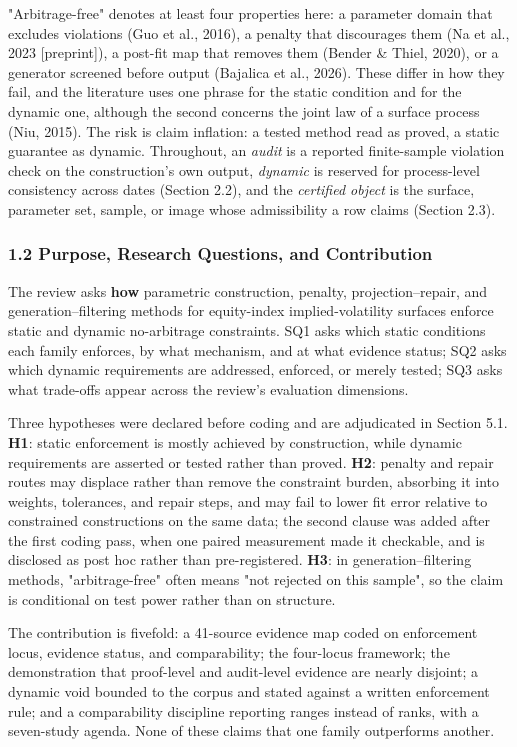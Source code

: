 \documentclass[11pt]{article}
\begin{document}
"Arbitrage-free" denotes at least four properties here: a parameter domain that excludes violations (Guo et al., 2016), a penalty that discourages them (Na et al., 2023 [preprint]), a post-fit map that removes them (Bender \& Thiel, 2020), or a generator screened before output (Bajalica et al., 2026). These differ in how they fail, and the literature uses one phrase for the static condition and for the dynamic one, although the second concerns the joint law of a surface process (Niu, 2015). The risk is claim inflation: a tested method read as proved, a static guarantee as dynamic. Throughout, an \textit{audit} is a reported finite-sample violation check on the construction's own output, \textit{dynamic} is reserved for process-level consistency across dates (Section 2.2), and the \textit{certified object} is the surface, parameter set, sample, or image whose admissibility a row claims (Section 2.3).

\subsubsection*{1.2 Purpose, Research Questions, and Contribution}
The review asks \textbf{how} parametric construction, penalty, projection–repair, and generation–filtering methods for equity-index implied-volatility surfaces enforce static and dynamic no-arbitrage constraints. SQ1 asks which static conditions each family enforces, by what mechanism, and at what evidence status; SQ2 asks which dynamic requirements are addressed, enforced, or merely tested; SQ3 asks what trade-offs appear across the review's evaluation dimensions.

Three hypotheses were declared before coding and are adjudicated in Section 5.1. \textbf{H1}: static enforcement is mostly achieved by construction, while dynamic requirements are asserted or tested rather than proved. \textbf{H2}: penalty and repair routes may displace rather than remove the constraint burden, absorbing it into weights, tolerances, and repair steps, and may fail to lower fit error relative to constrained constructions on the same data; the second clause was added after the first coding pass, when one paired measurement made it checkable, and is disclosed as post hoc rather than pre-registered. \textbf{H3}: in generation–filtering methods, "arbitrage-free" often means "not rejected on this sample", so the claim is conditional on test power rather than on structure.

The contribution is fivefold: a 41-source evidence map coded on enforcement locus, evidence status, and comparability; the four-locus framework; the demonstration that proof-level and audit-level evidence are nearly disjoint; a dynamic void bounded to the corpus and stated against a written enforcement rule; and a comparability discipline reporting ranges instead of ranks, with a seven-study agenda. None of these claims that one family outperforms another.
\end{document}
